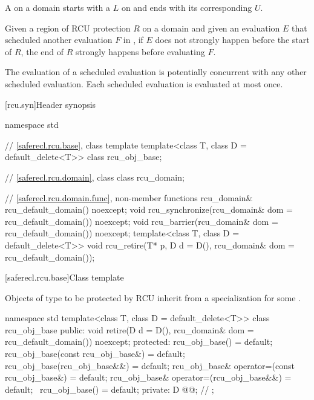 \pnum
A  on a domain 
starts with a  $L$ on  and
ends with its corresponding  $U$.

\pnum
Given a region of RCU protection $R$ on a domain  and
given an evaluation $E$ that scheduled another evaluation $F$ in ,
if $E$ does not strongly happen before the start of $R$,
the end of $R$ strongly happens before evaluating $F$.

\pnum
The evaluation of a scheduled evaluation is potentially concurrent with
any other scheduled evaluation.
Each scheduled evaluation is evaluated at most once.

[rcu.syn]{Header  synopsis}

\begin{codeblock}
namespace std {
  // \ref{saferecl.rcu.base}, class template 
  template<class T, class D = default_delete<T>> class rcu_obj_base;

  // \ref{saferecl.rcu.domain}, class 
  class rcu_domain;

  // \ref{saferecl.rcu.domain.func}, non-member functions
  rcu_domain& rcu_default_domain() noexcept;
  void rcu_synchronize(rcu_domain& dom = rcu_default_domain()) noexcept;
  void rcu_barrier(rcu_domain& dom = rcu_default_domain()) noexcept;
  template<class T, class D = default_delete<T>>
    void rcu_retire(T* p, D d = D(), rcu_domain& dom = rcu_default_domain());
}
\end{codeblock}

[saferecl.rcu.base]{Class template }

\pnum
Objects of type  to be protected by RCU inherit from
a specialization  for some .

\begin{codeblock}
namespace std {
  template<class T, class D = default_delete<T>>
  class rcu_obj_base {
  public:
    void retire(D d = D(), rcu_domain& dom = rcu_default_domain()) noexcept;
  protected:
    rcu_obj_base() = default;
    rcu_obj_base(const rcu_obj_base&) = default;
    rcu_obj_base(rcu_obj_base&&) = default;
    rcu_obj_base& operator=(const rcu_obj_base&) = default;
    rcu_obj_base& operator=(rcu_obj_base&&) = default;
    ~rcu_obj_base() = default;
  private:
    D @@;            // \expos
  };
}
\end{codeblock}

